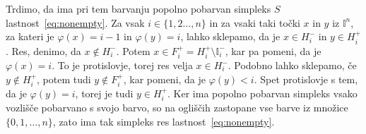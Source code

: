 \documentclass[mat1]{fmfdelo}
\newcommand{\I}{\mathbb I}
\newcommand{\0}{\underline{0}}
\begin{document}
\begin{dokaz}
Trdimo, da ima pri tem barvanju popolno pobarvan simpleks $S$ lastnost~\eqref{eq:nonempty}. 
Za vsak $i \in \{1, 2 \dots, n \}$ in za vsaki taki točki $x$ in $y$ iz $\I^n$, za kateri je $\varphi(x) = i - 1$ in $\varphi(y) = i$, lahko sklepamo, da je $x \in H_{i}^-$ in $y \in H_i^+$. Res, denimo, da  $x \notin H_{i}^-$. Potem  $x \in F_i^+ = H_{i}^+ \setminus \I_i^-$, kar pa pomeni, da je $\varphi(x) = i$. To je protislovje, torej res velja $x \in H_{i}^-$. Podobno lahko sklepamo, če $y \notin H_i^+$, potem tudi $y \notin F_i^+$, kar pomeni, da je $\varphi(y) < i$. Spet protislovje s tem, da je $\varphi(y) = i$, torej je tudi $y \in H_i^+$.
Ker ima popolno pobarvan simpleks vsako vozlišče pobarvano s svojo barvo, so na ogliščih zastopane vse barve iz množice $\{ 0, 1, \dots, n \}$, zato ima tak simpleks res lastnost~\eqref{eq:nonempty}. 


\end{dokaz}
\end{document}
